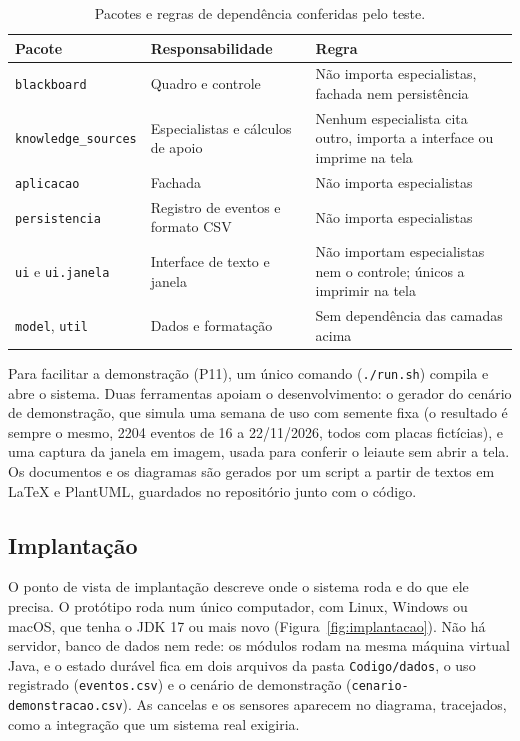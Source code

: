 \begin{table}[!htbp]
\centering
\caption{Pacotes e regras de dependência conferidas pelo teste.}
\label{tab:dependencias}
\begin{tabular}{L{4.0cm}L{4.8cm}L{5.7cm}}
\toprule
\textbf{Pacote} & \textbf{Responsabilidade} & \textbf{Regra} \\
\midrule
\texttt{blackboard} & Quadro e controle & Não importa especialistas, fachada nem persistência \\
\texttt{knowledge\_sources} & Especialistas e cálculos de apoio & Nenhum especialista cita outro, importa a interface ou imprime na tela \\
\texttt{aplicacao} & Fachada & Não importa especialistas \\
\texttt{persistencia} & Registro de eventos e formato CSV & Não importa especialistas \\
\texttt{ui} e \texttt{ui.janela} & Interface de texto e janela & Não importam especialistas nem o controle; únicos a imprimir na tela \\
\texttt{model}, \texttt{util} & Dados e formatação & Sem dependência das camadas acima \\
\bottomrule
\end{tabular}
\end{table}

Para facilitar a demonstração (P11), um único comando (\texttt{./run.sh}) compila e abre o sistema. Duas ferramentas apoiam o desenvolvimento: o gerador do cenário de demonstração, que simula uma semana de uso com semente fixa (o resultado é sempre o mesmo, 2204 eventos de 16 a 22/11/2026, todos com placas fictícias), e uma captura da janela em imagem, usada para conferir o leiaute sem abrir a tela. Os documentos e os diagramas são gerados por um script a partir de textos em LaTeX e PlantUML, guardados no repositório junto com o código.

\subsection{Implantação}

O ponto de vista de implantação descreve onde o sistema roda e do que ele precisa. O protótipo roda num único computador, com Linux, Windows ou macOS, que tenha o JDK 17 ou mais novo (Figura~\ref{fig:implantacao}). Não há servidor, banco de dados nem rede: os módulos rodam na mesma máquina virtual Java, e o estado durável fica em dois arquivos da pasta \texttt{Codigo/dados}, o uso registrado (\texttt{eventos.csv}) e o cenário de demonstração (\texttt{cenario-demonstracao.csv}). As cancelas e os sensores aparecem no diagrama, tracejados, como a integração que um sistema real exigiria.

